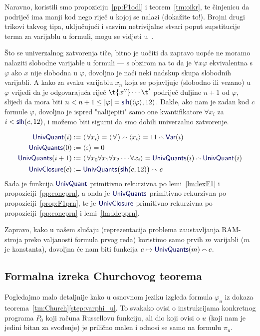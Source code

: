 Naravno, koristili smo propoziciju~\ref{pp:F1odl} i teorem~\ref{tm:oikr}, te činjenicu da podriječ ima manji kod nego riječ u kojoj se nalazi (dokažite to!). Brojni drugi trikovi takvog tipa, uključujući i sasvim netrivijalne stvari poput supstitucije terma za varijablu u formuli, mogu se vidjeti u~\cite{smullyan}.

Što se univerzalnog zatvorenja tiče, bitno je uočiti da zapravo uopće ne moramo nalaziti slobodne varijable u formuli --- s obzirom na to da je $\forall x\varphi$ ekvivalentna s $\varphi$ ako $x$ nije slobodna u $\varphi$, dovoljno je naći neki nadskup skupa slobodnih varijabli. A kako za svaku varijablu $x_n$ koja se pojavljuje (slobodno ili vezano) u $\varphi$ vrijedi da je odgovarajuća riječ $\t{x{}'{}'}\dotsm\t'$ podriječ duljine $n+1$ od $\varphi$, slijedi da mora biti $n<n+1\le\dulj\varphi=\f{slh}(\kr{\varphi},12)$. Dakle, ako nam je zadan kod $c$ formule $\varphi$, dovoljno je ispred "nalijepiti" samo one kvantifikatore $\forall x_i$ za $i<\f{slh}(c,12)$, i možemo biti sigurni da smo dobili univerzalno zatvorenje.

\noindent\begin{align}
    \f{UnivQuant}(i)&:=\kr{\,\forall x_i}=\kr{\,\forall\,}\conc{}\kr{x_i}=11\conc{}\f{Var}(i)\\
    \f{UnivQuants}(0)&:=\kr{\varepsilon}=0\\
    \f{UnivQuants}(i+1)&:=\kr{\,\forall x_0\forall x_1\forall x_2\dotsm\forall x_i}=\f{UnivQuants}(i)\conc{}\f{UnivQuant}(i)\\
    \f{UnivClosure}(c)&:=\f{UnivQuants}\bigl(\f{slh}(c,12)\bigr)\conc{}\,c
\end{align}
Sada je funkcija $\f{UnivQuant}$ primitivno rekurzivna po lemi~\ref{lm:lexF1} i propoziciji~\ref{pp:concprn}, a onda je $\f{UnivQuants}$ primitivno rekurzivna po propoziciji~\ref{prop:F1prn}, te je $\f{UnivClosure}$ primitivno rekurzivna po propoziciji~\ref{pp:concprn} i lemi~\ref{lm:ldcpprn}.

Zapravo, kako u našem slučaju (reprezentacija problema zaustavljanja RAM-stroja preko valjanosti formula prvog reda) koristimo samo prvih $m$ varijabli ($m$ je konstanta), dovoljna će nam biti funkcija $c\mapsto\f{UnivQuants}(m)\conc{}c$.

\subsection{Formalna izreka Churchovog teorema}

Pogledajmo malo detaljnije kako u osnovnom jeziku izgleda formula $\varphi_u$ iz dokaza teorema~\ref{tm:Church}\eqref{step:varphi_u}. To svakako ovisi o instrukcijama konkretnog programa $P_0$ koji računa Russellovu funkciju, ali dio koji ovisi o $u$ (koji nam je jedini bitan za svođenje) je prilično malen i odnosi se samo na formulu $\pi_u$.

